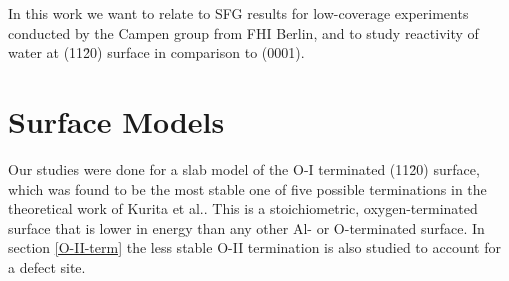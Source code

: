 \documentclass[11pt,DIV=13,BCOR=5mm,a4paper,headinclude]{scrbook}
\begin{document}
In this work we want to relate to SFG results for low-coverage experiments conducted by the Campen group from FHI Berlin, and to study reactivity of water at (11\=20) surface in comparison to (0001).

\section{Surface Models}
Our studies were done for a slab model of the O-I terminated (11\=20) surface, which was found to be the most stable one of five possible terminations in the theoretical work of Kurita et al.\cite{kuri10}.
This is a stoichiometric, oxygen-terminated surface that is lower in energy than any other Al- or O-terminated surface.
In section \ref{O-II-term} the less stable O-II termination is also studied to account for a defect site.
\end{document}
